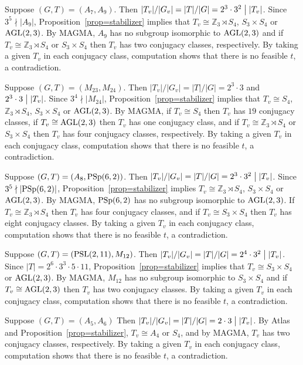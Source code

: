 \documentclass[12pt]{article}
\def\di{\bigm|} \def\lg{\langle} \def\rg{\rangle}
\def\PSL{\hbox{\rm PSL}}\def\PSU{\hbox{\rm PSU}}
\def\PSp{\hbox{\rm PSp}}\def\P\GammaL{\hbox{\rm P\Gamma L}} \def\ASIL{\hbox{\rm A\Sigma L}}
\def\mz{{\mathbb Z}}
\begin{document}
Suppose $(G,T)=(A_7,A_9)$. Then $|T_v|/|G_v|=|T|/|G|=2^3\cdot 3^2\di |T_v|$. Since $3^5\nmid |A_9|$,  Proposition~\ref{prop=stabilizer} implies that
$T_v\cong \mz_3\rtimes S_4 $, $S_3\times S_4$ or $\rm AGL(2,3)$. By MAGMA, $A_9$ has no subgroup isomorphic to $\rm AGL(2,3)$ and if $T_v\cong \mz_3\rtimes S_4 $ or $S_3\times S_4$ then $T_v$ has two conjugacy classes, respectively. By taking a given $T_v$ in each conjugacy class, computation shows that there is no feasible $t$, a contradiction.

Suppose $(G,T)=(M_{23},M_{24})$. Then $|T_v|/|G_v|=|T|/|G|= 2^3\cdot3$ and $2^3\cdot3\di |T_v|$. Since $3^4\nmid |M_{24}|$,  Proposition~\ref{prop=stabilizer} implies that $T_v\cong S_4$, $ \mz_3\rtimes S_4 $, $S_3\times S_4$ or $\rm AGL(2,3)$. By MAGMA, if $T_v\cong S_4$ then $T_v$ has $19$ conjugacy classes, if $T_v\cong \rm AGL(2,3)$ then $T_v$ has one conjugacy class, and if $T_v\cong \mz_3\rtimes S_4 $ or $S_3\times S_4$ then $T_v$ has four conjugacy classes, respectively. By taking a given $T_v$ in each conjugacy class, computation shows that there is no feasible $t$, a contradiction.

Suppose $(G,T)=(A_8,\PSp(6,2))$. Then $|T_v|/|G_v|=|T|/|G|= 2^3\cdot3^2\di |T_v|$. Since $3^5\nmid |\PSp(6,2)|$,  Proposition~\ref{prop=stabilizer} implies $T_v\cong \mz_3\rtimes S_4 $, $S_3\times S_4$ or $\rm AGL(2,3)$. By MAGMA, $\PSp(6,2)$ has no subgroup isomorphic to $\rm AGL(2,3)$. If $T_v\cong \mz_3\rtimes S_4 $ then $T_v$ has four conjugacy classes, and if $T_v\cong S_3\times S_4$ then $T_v$ has eight conjugacy classes. By taking a given $T_v$ in each conjugacy class, computation shows that there is no feasible $t$, a contradiction.

Suppose $(G,T)=(\PSL(2,11),M_{12})$. Then $|T_v|/|G_v|=|T|/|G|= 2^4\cdot3^2\di |T_v|$. Since $|T|=2^6 \cdot 3^3 \cdot5\cdot 11$, Proposition~\ref{prop=stabilizer} implies that $T_v\cong S_3\times S_4$ or $\rm AGL(2,3)$. By MAGMA, $M_{12}$ has no subgroup isomorphic to $S_3\times S_4$ and if $T_v\cong \rm AGL(2,3) $ then $T_v$ has two conjugacy classes. By taking a given $T_v$ in each conjugacy class, computation shows that there is no feasible $t$, a contradiction.

Suppose $(G,T)=(A_5,A_6)$ Then  $|T_v|/|G_v|=|T|/|G|=2\cdot 3\di |T_v|$. By Atlas~\cite[pp.4]{Atlas} and Proposition~\ref{prop=stabilizer}, $T_v\cong A_4$ or $S_4$, and by MAGMA, $T_v$ has two conjugacy classes, respectively. By taking a given $T_v$ in each conjugacy class, computation shows that there is no feasible $t$, a contradiction.
\end{document}
